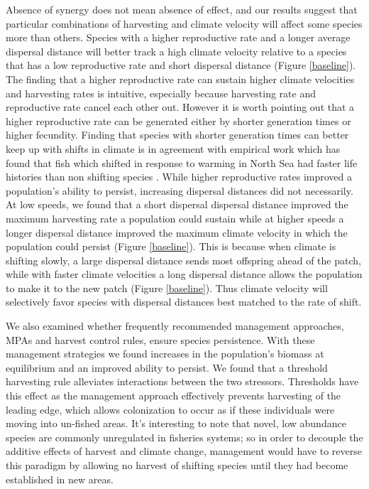 \documentclass[12pt,english]{article}
\begin{document}
\begin{spacing}{1.9}
\begin{flushleft}
Absence of synergy does not mean absence of effect, and our results suggest that particular combinations of harvesting and climate velocity will affect some species more than others. Species with a higher reproductive rate and a longer average dispersal distance will better track a high climate velocity relative to a species that has a low reproductive rate and short dispersal distance (Figure \ref{baseline}). The finding that a higher reproductive rate can sustain higher climate velocities and harvesting rates is intuitive, especially because harvesting rate and reproductive rate cancel each other out. However it is worth pointing out that a higher reproductive rate can be generated either by shorter generation times or higher fecundity. Finding that species with shorter generation times can better keep up with shifts in climate is in agreement with empirical work which has found that fish which shifted in response to warming in North Sea had faster life histories than non shifting species \citep{Perryetal2005}. While higher reproductive rates improved a population's ability to persist, increasing dispersal distances did not necessarily. At low speeds, we found that a short dispersal dispersal distance improved the maximum harvesting rate a population could sustain while at higher speeds a longer dispersal distance improved the maximum climate velocity in which the population could persist (Figure \ref{baseline}). This is because when climate is shifting slowly, a large dispersal distance sends most offspring ahead of the patch, while with faster climate velocities a long dispersal distance allows the population to make it to the new patch (Figure \ref{baseline}). Thus climate velocity will selectively favor species with dispersal distances best matched to the rate of shift.   

We also examined whether frequently recommended management approaches, MPAs and harvest control rules, ensure species persistence. With these management strategies we found increases in the population's biomass at equilibrium and an improved ability to persist.  We found that a threshold harvesting rule alleviates interactions between the two stressors. Thresholds have this effect as the management approach effectively prevents harvesting of the leading edge, which allows colonization to occur as if these individuals were moving into un-fished areas. It's interesting to note that novel, low abundance species are commonly unregulated in fisheries systems; so in order to decouple the additive effects of harvest and climate change, management would have to reverse this paradigm by allowing no harvest of shifting species until they had become established in new areas.  


\end{flushleft}
\end{spacing}
\end{document}
